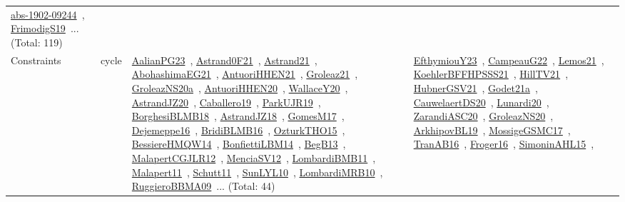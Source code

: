 {\begin{longtable}{lp{3cm}>{\raggedright\arraybackslash}p{6cm}>{\raggedright\arraybackslash}p{6cm}>{\raggedright\arraybackslash}p{8cm}}
\href{../works/abs-1902-09244.pdf}{abs-1902-09244}~\cite{abs-1902-09244}, \href{../works/FrimodigS19.pdf}{FrimodigS19}~\cite{FrimodigS19}... (Total: 119)\\
Constraints & cycle & \href{../works/AalianPG23.pdf}{AalianPG23}~\cite{AalianPG23}, \href{../works/Astrand0F21.pdf}{Astrand0F21}~\cite{Astrand0F21}, \href{../works/Astrand21.pdf}{Astrand21}~\cite{Astrand21}, \href{../works/AbohashimaEG21.pdf}{AbohashimaEG21}~\cite{AbohashimaEG21}, \href{../works/AntuoriHHEN21.pdf}{AntuoriHHEN21}~\cite{AntuoriHHEN21}, \href{../works/Groleaz21.pdf}{Groleaz21}~\cite{Groleaz21}, \href{../works/GroleazNS20a.pdf}{GroleazNS20a}~\cite{GroleazNS20a}, \href{../works/AntuoriHHEN20.pdf}{AntuoriHHEN20}~\cite{AntuoriHHEN20}, \href{../works/WallaceY20.pdf}{WallaceY20}~\cite{WallaceY20}, \href{../works/AstrandJZ20.pdf}{AstrandJZ20}~\cite{AstrandJZ20}, \href{../works/Caballero19.pdf}{Caballero19}~\cite{Caballero19}, \href{../works/ParkUJR19.pdf}{ParkUJR19}~\cite{ParkUJR19}, \href{../works/BorghesiBLMB18.pdf}{BorghesiBLMB18}~\cite{BorghesiBLMB18}, \href{../works/AstrandJZ18.pdf}{AstrandJZ18}~\cite{AstrandJZ18}, \href{../works/GomesM17.pdf}{GomesM17}~\cite{GomesM17}, \href{../works/Dejemeppe16.pdf}{Dejemeppe16}~\cite{Dejemeppe16}, \href{../works/BridiBLMB16.pdf}{BridiBLMB16}~\cite{BridiBLMB16}, \href{../works/OzturkTHO15.pdf}{OzturkTHO15}~\cite{OzturkTHO15}, \href{../works/BessiereHMQW14.pdf}{BessiereHMQW14}~\cite{BessiereHMQW14}, \href{../works/BonfiettiLBM14.pdf}{BonfiettiLBM14}~\cite{BonfiettiLBM14}, \href{../works/BegB13.pdf}{BegB13}~\cite{BegB13}, \href{../works/MalapertCGJLR12.pdf}{MalapertCGJLR12}~\cite{MalapertCGJLR12}, \href{../works/MenciaSV12.pdf}{MenciaSV12}~\cite{MenciaSV12}, \href{../works/LombardiBMB11.pdf}{LombardiBMB11}~\cite{LombardiBMB11}, \href{../works/Malapert11.pdf}{Malapert11}~\cite{Malapert11}, \href{../works/Schutt11.pdf}{Schutt11}~\cite{Schutt11}, \href{../works/SunLYL10.pdf}{SunLYL10}~\cite{SunLYL10}, \href{../works/LombardiMRB10.pdf}{LombardiMRB10}~\cite{LombardiMRB10}, \href{../works/RuggieroBBMA09.pdf}{RuggieroBBMA09}~\cite{RuggieroBBMA09}... (Total: 44) & \href{../works/EfthymiouY23.pdf}{EfthymiouY23}~\cite{EfthymiouY23}, \href{../works/CampeauG22.pdf}{CampeauG22}~\cite{CampeauG22}, \href{../works/Lemos21.pdf}{Lemos21}~\cite{Lemos21}, \href{../works/KoehlerBFFHPSSS21.pdf}{KoehlerBFFHPSSS21}~\cite{KoehlerBFFHPSSS21}, \href{../works/HillTV21.pdf}{HillTV21}~\cite{HillTV21}, \href{../works/HubnerGSV21.pdf}{HubnerGSV21}~\cite{HubnerGSV21}, \href{../works/Godet21a.pdf}{Godet21a}~\cite{Godet21a}, \href{../works/CauwelaertDS20.pdf}{CauwelaertDS20}~\cite{CauwelaertDS20}, \href{../works/Lunardi20.pdf}{Lunardi20}~\cite{Lunardi20}, \href{../works/ZarandiASC20.pdf}{ZarandiASC20}~\cite{ZarandiASC20}, \href{../works/GroleazNS20.pdf}{GroleazNS20}~\cite{GroleazNS20}, \href{../works/ArkhipovBL19.pdf}{ArkhipovBL19}~\cite{ArkhipovBL19}, \href{../works/MossigeGSMC17.pdf}{MossigeGSMC17}~\cite{MossigeGSMC17}, \href{../works/TranAB16.pdf}{TranAB16}~\cite{TranAB16}, \href{../works/Froger16.pdf}{Froger16}~\cite{Froger16}, \href{../works/SimoninAHL15.pdf}{SimoninAHL15}~\cite{SimoninAHL15}, 
\end{longtable}}
